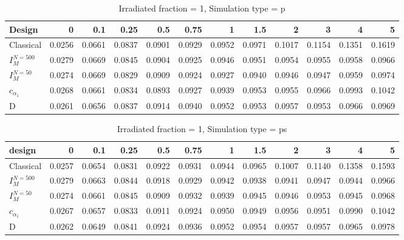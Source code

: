 \documentclass[a4paper]{article}
\begin{document}
\begin{table}[H]
\centering
\begin{tabular}{lrrrrrrrrrrr}
  \hline
Design & 0 & 0.1 & 0.25 & 0.5 & 0.75 & 1 & 1.5 & 2 & 3 & 4 & 5 \\ 
  \hline
Classical & 0.0256 & 0.0661 & 0.0837 & 0.0901 & 0.0929 & 0.0952 & 0.0971 & 0.1017 & 0.1154 & 0.1351 & 0.1619 \\ 
  $I_M^{N=500}$ & 0.0279 & 0.0669 & 0.0845 & 0.0904 & 0.0925 & 0.0946 & 0.0951 & 0.0954 & 0.0955 & 0.0958 & 0.0966 \\ 
  $I_M^{N=50}$ & 0.0274 & 0.0669 & 0.0829 & 0.0909 & 0.0924 & 0.0927 & 0.0940 & 0.0946 & 0.0947 & 0.0959 & 0.0974 \\ 
  $c_{\alpha_1}$ & 0.0268 & 0.0661 & 0.0834 & 0.0893 & 0.0927 & 0.0939 & 0.0953 & 0.0955 & 0.0966 & 0.0993 & 0.1042 \\ 
  D & 0.0261 & 0.0656 & 0.0837 & 0.0914 & 0.0940 & 0.0952 & 0.0953 & 0.0957 & 0.0953 & 0.0966 & 0.0969 \\ 
   \hline
\end{tabular}
\caption{Irradiated fraction = 1, Simulation type = p} 
\end{table}

\begin{table}[ht]
\centering
\begin{tabular}{lrrrrrrrrrrr}
  \hline
design & 0 & 0.1 & 0.25 & 0.5 & 0.75 & 1 & 1.5 & 2 & 3 & 4 & 5 \\ 
  \hline
Classical & 0.0257 & 0.0654 & 0.0831 & 0.0922 & 0.0931 & 0.0944 & 0.0965 & 0.1007 & 0.1140 & 0.1358 & 0.1593 \\ 
  $I_M^{N=500}$ & 0.0279 & 0.0663 & 0.0844 & 0.0918 & 0.0929 & 0.0942 & 0.0938 & 0.0941 & 0.0947 & 0.0944 & 0.0966 \\ 
  $I_M^{N=50}$ & 0.0274 & 0.0661 & 0.0845 & 0.0909 & 0.0932 & 0.0939 & 0.0945 & 0.0946 & 0.0953 & 0.0945 & 0.0968 \\ 
  $c_{\alpha_1}$ & 0.0267 & 0.0657 & 0.0833 & 0.0911 & 0.0924 & 0.0950 & 0.0949 & 0.0956 & 0.0951 & 0.0990 & 0.1042 \\ 
  D & 0.0262 & 0.0649 & 0.0841 & 0.0924 & 0.0936 & 0.0952 & 0.0954 & 0.0957 & 0.0957 & 0.0965 & 0.0978 \\ 
   \hline
\end{tabular}
\caption{Irradiated fraction = 1, Simulation type = ps} 
\end{table}
\end{document}
